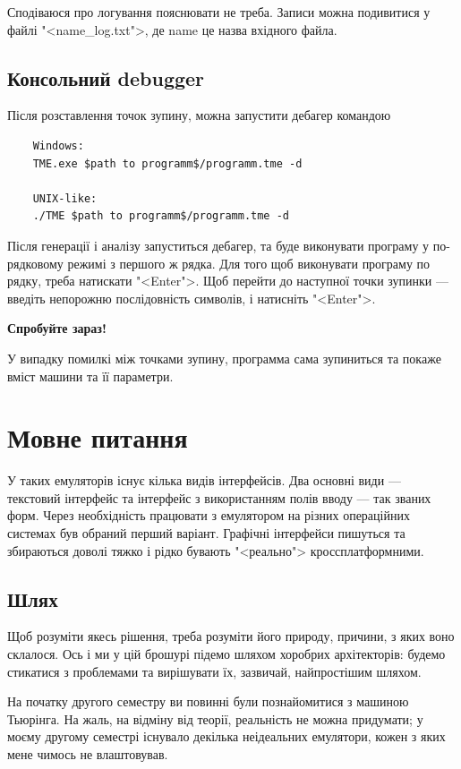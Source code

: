 \documentclass[oneside,final,14pt]{extreport}
\begin{document}
Сподіваюся про логування пояснювати не треба. Записи можна подивитися у файлі "<name\_log.txt">, де name це назва вхідного файла.

\section{Консольний debugger}
Після розставлення точок зупину, можна запустити дебагер командою
\begin{tcolorbox}	
\begin{verbatim}
	Windows:
	TME.exe $path to programm$/programm.tme -d

	UNIX-like:
	./TME $path to programm$/programm.tme -d
\end{verbatim}
\end{tcolorbox}

Після генерації і аналізу запуститься дебагер, та буде виконувати програму у по-рядковому режимі з першого ж рядка.
Для того щоб виконувати програму по рядку, треба натискати "<Enter">. Щоб перейти до наступної точки зупинки --- введіть непорожню послідовність символів, і натисніть "<Enter">.

{\bfseries Спробуйте зараз!}

У випадку помилкі між точками зупину, программа сама зупиниться та покаже вміст машини та її параметри.

\chapter{Мовне питання}
\label{chapter:1}
У таких емуляторів існує кілька видів інтерфейсів. Два основні види --- текстовий інтерфейс та інтерфейс з використанням полів вводу --- так званих форм. Через необхідність працювати з емулятором на різних операційних системах був обраний перший варіант. Графічні інтерфейси пишуться та збираються доволі тяжко і рідко бувають "<реально"> кроссплатформними.
\section{Шлях}
Щоб розуміти якесь рішення, треба розуміти його природу, причини, з яких воно склалося. Ось і ми у цій брошурі підемо шляхом хоробрих архітекторів: будемо стикатися з проблемами та вирішувати їх, зазвичай, найпростішим шляхом.

На початку другого семестру ви повинні були познайомитися з машиною Тьюрінга. На жаль, на відміну від теорії, реальність не можна придумати; у моєму другому семестрі існувало декілька неідеальних емулятори, кожен з яких мене чимось не влаштовував. 
\end{document}
